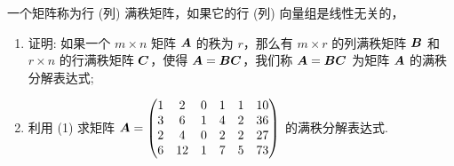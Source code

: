 \begin{example}
    一个矩阵称为行 (列) 满秩矩阵，如果它的行 (列) 向量组是线性无关的，
    \begin{enumerate}[label=(\arabic{*})]
        \item 证明: 如果一个 $m\times n$ 矩阵 $\vb*{A}$ 的秩为 $r$，那么有 $m\times r$ 的列满秩矩阵 $\vb*{B}$ 和 $r\times n$ 的行满秩矩阵 $\vb*{C}$，使得 $\vb*{A}=\vb*{BC}$，我们称 $\vb*{A}=\vb*{BC}$ 为矩阵 $\vb*{A}$ 的满秩分解表达式;
        \item 利用 (1) 求矩阵 $\vb*{A}=\mqty(1&2&0&1&1&10\\3&6&1&4&2&36\\2&4&0&2&2&27\\6&12&1&7&5&73)$ 的满秩分解表达式.
    \end{enumerate}
\end{example}
